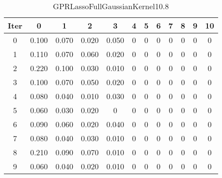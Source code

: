 \begin{table}
	\begin{center}
		\begin{tabular}{|c|c|c|c|c|c|c|c|c|c|c|c|}
			\hline
			Iter & 0 & 1 & 2 & 3 & 4 & 5 & 6 & 7 & 8 & 9 & 10 \\
			\hline
			0 & 0.100 & 0.070 & 0.020 & 0.050 & 0 & 0 & 0 & 0 & 0 & 0 & 0 \\
			\hline
			1 & 0.110 & 0.070 & 0.060 & 0.020 & 0 & 0 & 0 & 0 & 0 & 0 & 0 \\
			\hline
			2 & 0.220 & 0.100 & 0.030 & 0.010 & 0 & 0 & 0 & 0 & 0 & 0 & 0 \\
			\hline
			3 & 0.100 & 0.070 & 0.050 & 0.020 & 0 & 0 & 0 & 0 & 0 & 0 & 0 \\
			\hline
			4 & 0.080 & 0.040 & 0.010 & 0.030 & 0 & 0 & 0 & 0 & 0 & 0 & 0 \\
			\hline
			5 & 0.060 & 0.030 & 0.020 & 0 & 0 & 0 & 0 & 0 & 0 & 0 & 0 \\
			\hline
			6 & 0.090 & 0.060 & 0.020 & 0.040 & 0 & 0 & 0 & 0 & 0 & 0 & 0 \\
			\hline
			7 & 0.080 & 0.040 & 0.030 & 0.010 & 0 & 0 & 0 & 0 & 0 & 0 & 0 \\
			\hline
			8 & 0.210 & 0.090 & 0.070 & 0.010 & 0 & 0 & 0 & 0 & 0 & 0 & 0 \\
			\hline
			9 & 0.060 & 0.040 & 0.020 & 0.010 & 0 & 0 & 0 & 0 & 0 & 0 & 0 \\
			\hline
		\end{tabular}
	\end{center}
	\caption{GPRLassoFullGaussianKernel10.8}
\end{table}